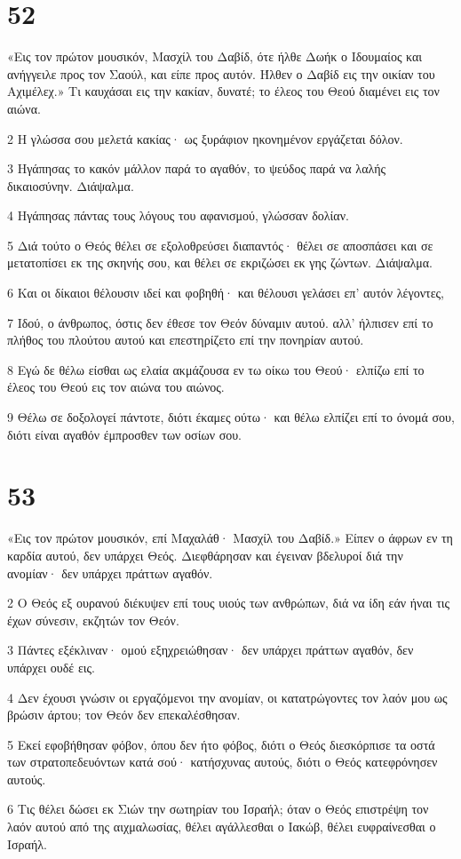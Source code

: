 \chapter{52}

\par «Εις τον πρώτον μουσικόν, Μασχίλ του Δαβίδ, ότε ήλθε Δωήκ ο Ιδουμαίος και ανήγγειλε προς τον Σαούλ, και είπε προς αυτόν. Ήλθεν ο Δαβίδ εις την οικίαν του Αχιμέλεχ.» Τι καυχάσαι εις την κακίαν, δυνατέ; το έλεος του Θεού διαμένει εις τον αιώνα.
\par 2 Η γλώσσα σου μελετά κακίας· ως ξυράφιον ηκονημένον εργάζεται δόλον.
\par 3 Ηγάπησας το κακόν μάλλον παρά το αγαθόν, το ψεύδος παρά να λαλής δικαιοσύνην. Διάψαλμα.
\par 4 Ηγάπησας πάντας τους λόγους του αφανισμού, γλώσσαν δολίαν.
\par 5 Διά τούτο ο Θεός θέλει σε εξολοθρεύσει διαπαντός· θέλει σε αποσπάσει και σε μετατοπίσει εκ της σκηνής σου, και θέλει σε εκριζώσει εκ γης ζώντων. Διάψαλμα.
\par 6 Και οι δίκαιοι θέλουσιν ιδεί και φοβηθή· και θέλουσι γελάσει επ' αυτόν λέγοντες,
\par 7 Ιδού, ο άνθρωπος, όστις δεν έθεσε τον Θεόν δύναμιν αυτού. αλλ' ήλπισεν επί το πλήθος του πλούτου αυτού και επεστηρίζετο επί την πονηρίαν αυτού.
\par 8 Εγώ δε θέλω είσθαι ως ελαία ακμάζουσα εν τω οίκω του Θεού· ελπίζω επί το έλεος του Θεού εις τον αιώνα του αιώνος.
\par 9 Θέλω σε δοξολογεί πάντοτε, διότι έκαμες ούτω· και θέλω ελπίζει επί το όνομά σου, διότι είναι αγαθόν έμπροσθεν των οσίων σου.

\chapter{53}

\par «Εις τον πρώτον μουσικόν, επί Μαχαλάθ· Μασχίλ του Δαβίδ.» Είπεν ο άφρων εν τη καρδία αυτού, δεν υπάρχει Θεός. Διεφθάρησαν και έγειναν βδελυροί διά την ανομίαν· δεν υπάρχει πράττων αγαθόν.
\par 2 Ο Θεός εξ ουρανού διέκυψεν επί τους υιούς των ανθρώπων, διά να ίδη εάν ήναι τις έχων σύνεσιν, εκζητών τον Θεόν.
\par 3 Πάντες εξέκλιναν· ομού εξηχρειώθησαν· δεν υπάρχει πράττων αγαθόν, δεν υπάρχει ουδέ εις.
\par 4 Δεν έχουσι γνώσιν οι εργαζόμενοι την ανομίαν, οι κατατρώγοντες τον λαόν μου ως βρώσιν άρτου; τον Θεόν δεν επεκαλέσθησαν.
\par 5 Εκεί εφοβήθησαν φόβον, όπου δεν ήτο φόβος, διότι ο Θεός διεσκόρπισε τα οστά των στρατοπεδευόντων κατά σού· κατήσχυνας αυτούς, διότι ο Θεός κατεφρόνησεν αυτούς.
\par 6 Τις θέλει δώσει εκ Σιών την σωτηρίαν του Ισραήλ; όταν ο Θεός επιστρέψη τον λαόν αυτού από της αιχμαλωσίας, θέλει αγάλλεσθαι ο Ιακώβ, θέλει ευφραίνεσθαι ο Ισραήλ.


